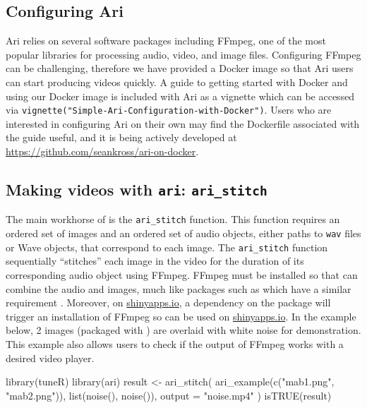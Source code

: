 \hypertarget{configuring-ari}{%
\subsection{Configuring Ari}\label{configuring-ari}}

Ari relies on several software packages including FFmpeg, one of the
most popular libraries for processing audio, video, and image files.
Configuring FFmpeg can be challenging, therefore we have provided a
Docker image so that Ari users can start producing videos quickly. A
guide to getting started with Docker and using our Docker image is
included with Ari as a vignette which can be accessed via
\texttt{vignette("Simple-Ari-Configuration-with-Docker")}. Users who are
interested in configuring Ari on their own may find the Dockerfile
associated with the guide useful, and it is being actively developed at
\url{https://github.com/seankross/ari-on-docker}.

\hypertarget{making-videos-with-ari-ari_stitch}{%
\subsection{\texorpdfstring{Making videos with \texttt{ari}:
\texttt{ari\_stitch}}{Making videos with ari: ari\_stitch}}\label{making-videos-with-ari-ari_stitch}}

The main workhorse of  is the \texttt{ari\_stitch} function.
This function requires an ordered set of images and an ordered set of
audio objects, either paths to \texttt{wav} files or  Wave
objects, that correspond to each image. The \texttt{ari\_stitch}
function sequentially ``stitches'' each image in the video for the
duration of its corresponding audio object using FFmpeg. FFmpeg must be
installed so that  can combine the audio and images, much like
packages such as  which have a similar requirement
\citep{aniart, anipkg}. Moreover, on
\href{https://www.shinyapps.io/}{shinyapps.io}, a dependency on the
 package will trigger an installation of FFmpeg so
 can be used on \href{https://www.shinyapps.io/}{shinyapps.io}.
In the example below, 2 images (packaged with ) are overlaid
with white noise for demonstration. This example also allows users to
check if the output of FFmpeg works with a desired video player.

\begin{example}
library(tuneR)
library(ari)
result <- ari_stitch(
  ari_example(c("mab1.png", "mab2.png")),
  list(noise(), noise()),
  output = "noise.mp4"
)
isTRUE(result)
\end{example}

